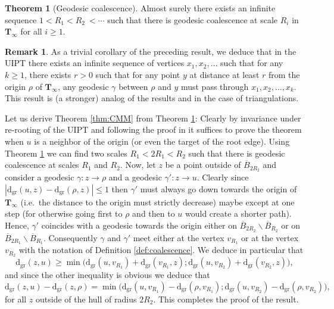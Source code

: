 \documentclass[10pt]{amsart}
\theoremstyle{definition}\newtheorem{defi}[theo]{Definition}\newtheorem{rema}[theo]{Remark}\newtheorem{exam}[theo]{Example}\newtheorem{exem}[theo]{Example}\newtheorem{nota}[theo]{Notation}
\newtheorem{theorem}[theo]{Theorem}\newtheorem{thm}[theo]{Theorem}\newtheorem{lemma}[theo]{Lemma}\newtheorem{proposition}[theo]{Proposition}\newtheorem{corollary}[theo]{Corollary}\newtheorem{remark}[theo]{Remark}\newtheorem{definition}[theo]{Definition}
\begin{document}
\begin{theorem}[Geodesic coalescence]  \label{thm:scale}Almost surely there exists an infinite sequence $1<R_{1}<R_{2}~<\cdots$ such that there is geodesic coalescence at scale $R_{i}$ in $\mathbf{T}_{\infty}$ for all $i \geq 1$.\end{theorem}
\begin{remark}
As a trivial corollary of the preceding result, we deduce that in the UIPT there exists an infinite sequence of vertices $x_{1},x_{2}, \dots$ such that for any $k \geq 1$, there exists $r>0$ such that for any point $y$ at distance at least $r$ from the origin $\rho$ of $\mathbf{T}_{\infty}$, any geodesic $\gamma$ between $\rho$ and $y$ must pass through $x_{1},x_{2}, \dots , x_{k}$. This result is (a stronger) analog of the results \cite[Lemma 3.3]{CMM10} and \cite[Theorem 3.4]{CMM10} in the case of triangulations.
\end{remark}
Let us derive Theorem \ref{thm:CMM} from Theorem \ref{thm:scale}:
  Clearly by invariance under re-rooting of the UIPT and following the proof in \cite{CMM10} it suffices to prove the theorem when $u$ is a neighbor of the origin (or even the target of the root edge). Using Theorem \ref{thm:scale} we can find two scales $R_{1}< 2 R_{1} < R_{2}$ such that there is geodesic coalescence at scales $R_{1}$ and $R_{2}$. Now, let $z$ be a point outside of $\overline{B}_{2R_{2}}$ and consider a geodesic $\gamma : z \to \rho$ and a geodesic $\gamma' : z \to u$. Clearly since $ |\mathrm{d_{gr}}(u,z) - \mathrm{d_{gr}}(\rho,z)| \leq 1$ then $\gamma'$ must always go down towards the origin of $\mathbf{T}_{\infty}$ (i.e.~the distance to the origin must strictly decrease) maybe except at one step (for otherwise going first to $\rho$ and then to $u$ would create a shorter path). Hence, $\gamma'$ coincides with a geodesic towards the origin either on $ \overline{B}_{2R_{2}} \backslash \overline{B}_{R_{2}}$ or on $ \overline{B}_{2R_{1}} \backslash \overline{B}_{R_{1}}$. Consequently $\gamma$ and $\gamma'$ meet either at the vertex $v_{R_{1}}$ or at the vertex $v_{R_{2}}$ with the notation of Definition \ref{def:coalescence}. We deduce in particular that
$$ \mathrm{d_{gr}}(z, u) \geq \min \big( \mathrm{d_{gr}}(u,v_{R_{1}}) + \mathrm{d_{gr}}(v_{R_{1}},z) ; \mathrm{d_{gr}}(u,v_{R_{2}}) + \mathrm{d_{gr}}(v_{R_{2}},z)\big),$$
 and since the other inequality is obvious we deduce that
 $$ \mathrm{d_{gr}}(z,u)-\mathrm{d_{gr}}(z,\rho) = \min \big( \mathrm{d_{gr}}(u,v_{R_{1}})- \mathrm{d_{gr}}(\rho,v_{R_{1}}) ; \mathrm{d_{gr}}(u,v_{R_{2}})- \mathrm{d_{gr}}(\rho,v_{R_{2}})\big),$$ for all $z$ outside of the hull of radius $2R_{2}$. This completes the proof of the result. \endproof
\end{document}
